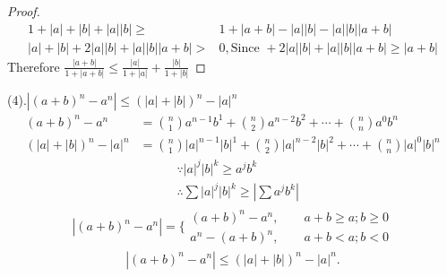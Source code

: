\begin{example}
\begin{proof}
\begin{align*}
		1+|a|+|b|+|a||b| \ge & 1+|a+b|-|a||b|-|a||b||a+b|\\
		|a|+|b|+2|a||b|+|a||b||a+b|>&0, \text{Since }+2|a||b|+|a||b||a+b|\ge|a+b|
	\end{align*}
	Therefore $\frac{|a+b|}{1+|a+b|}\le \frac{|a|}{1+|a|} + \frac{|b|}{1+|b|} $
	\end{proof}
\end{example}

\begin{example}
	(4).$ |(a+b)^n-a^n| \le (|a|+|b|)^n-|a|^n $
	\begin{align*}
		(a+b)^n-a^n &= \binom{n}{1}a^{n-1}b^{1} + \binom{n}{2}a^{n-2}b^{2} + \cdots + \binom{n}{n}a^{0}b^{n}\\
		(|a|+|b|)^n-|a|^n &= \binom{n}{1}|a|^{n-1}|b|^{1} + \binom{n}{2}|a|^{n-2}|b|^{2} + \cdots + \binom{n}{n}|a|^{0}|b|^{n}
	\end{align*}
	\begin{align*}
		&\because |a|^j|b|^k \ge a^j b^k\\
		&\therefore \sum |a|^j|b|^k \ge |\sum a^j b^k|
	\end{align*}
\begin{align*}
	|(a+b)^n-a^n| = \Big\lbrace 
	\begin{aligned}
		(a+b)^n-a^n,\qquad a+b\ge a; b\ge0\\
		a^n-(a+b)^n,\qquad a+b< a; b<0
	\end{aligned}
\end{align*}
\begin{equation}\label{keyEx134answer}
	|(a+b)^n-a^n| \le (|a|+|b|)^n - |a|^n.
\end{equation}
\end{example}


